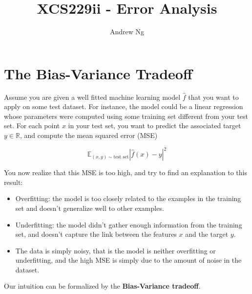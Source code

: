 \documentclass[12pt]{article}
\begin{document}
\title{XCS229ii - Error Analysis} 
\author{Andrew Ng}
\date{}
\maketitle


\section{The Bias-Variance Tradeoff}

Assume you are given a well fitted machine learning model $\hat{f}$ that you want to apply on some test dataset. For instance, the model could be a linear regression whose parameters were computed using some training set different from your test set. For each point $x$ in your test set, you want to predict the associated target $y \in \mathbb{R}$, and compute the mean squared error (MSE)

$$\mathbb{E}_{(x,y)\sim \text{test set}} |\hat{f}(x) - y|^2$$

You now realize that this MSE is too high, and try to find an explanation to this result:

\begin{itemize}
	\item Overfitting: the model is too closely related to the examples in the training set and doesn't generalize well to other examples.
	\item Underfitting: the model didn't gather enough information from the training set, and doesn't capture the link between the features $x$ and the target $y$.
	\item The data is simply noisy, that is the model is neither overfitting or underfitting, and the high MSE is simply due to the amount of noise in the dataset.
\end{itemize}

Our intuition can be formalized by the \textbf{Bias-Variance tradeoff}.
\end{document}
